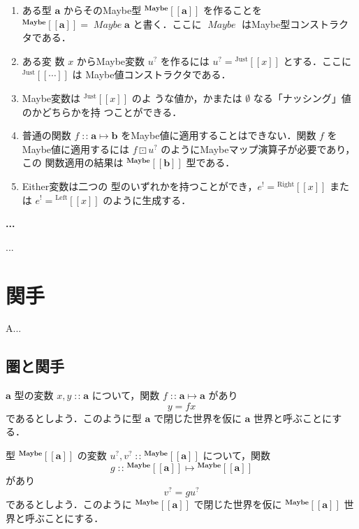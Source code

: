 \documentclass[a5paper,twoside,fleqn,draft]{jsbook}
\def\[{\left[\!\left[}
\def\]{\right]\!\right]}
\newenvironment{leader}{\begingroup\gt}{\endgroup}
\newenvironment{note}[1]{\begin{boxnote}\begin{center}\textbf{#1}\end{center}}{\end{boxnote}}
\newcommand{\mNothing}{\emptyset}
\DeclareMathOperator{\mIn}{{:\!:}}
\DeclareMathOperator{\mMapMaybe}{\boxdot}
\DeclareMathOperator{\mMapsTo}{\mapsto}
\newcommand{\mSpecialSub}[1]{\text{#1}}
\newcommand{\mLeft}{\mSpecialSub{Left}}
\newcommand{\mRight}{\mSpecialSub{Right}}
\newcommand{\mType}[1]{\mathbf{#1}}
\newcommand{\mGenericTypeAssemble}[2]{{}^{\mType{#1}}\[\mType{#2}\]}
\newcommand{\mMaybeType}[1]{\mGenericTypeAssemble{Maybe}{#1}}
\newcommand{\mTypeConstructor}[1]{\textit{#1}}
\DeclareMathOperator{\mMaybeTypeConstructor}{\mTypeConstructor{Maybe}}
\newcommand{\mValueConstructor}[1]{\mathrm{#1}}
\newcommand{\mGenericValueAssemble}[2]{{}^\mValueConstructor{#1}\[#2\]}
\newcommand{\mLeftWith}[1]{\mGenericValueAssemble{\mLeft}{#1}}
\newcommand{\mRightWith}[1]{\mGenericValueAssemble{\mRight}{#1}}
\newcommand{\mJustWith}[1]{\mGenericValueAssemble{Just}{#1}}
\newcommand{\mEither}[1]{{#1}^!}
\newcommand{\mMaybe}[1]{{#1}^?}
\newcommand{\mProj}[2]{#1\mMapsTo#2}
\begin{document}
\begin{enumerate}
\item ある型 $\mType{a}$ からそのMaybe型 $\mMaybeType{a}$ を作ることを
$\mMaybeType{a}=\mMaybeTypeConstructor\mType{a}$ と書く．ここに
$\mMaybeTypeConstructor$ はMaybe型コンストラクタである．\item ある変
数 $x$ からMaybe変数 $\mMaybe{u}$ を作るには
$\mMaybe{u}=\mJustWith{x}$ とする．ここに $\mJustWith{\dotsb}$ は
Maybe値コンストラクタである．\item Maybe変数は $\mJustWith{x}$ のよ
うな値か，かまたは $\mNothing$ なる「ナッシング」値のかどちらかを持
つことができる．\item 普通の関数 $f\mIn\mProj{\mType{a}}{\mType{b}}$
をMaybe値に適用することはできない．関数 $f$ をMaybe値に適用するには
$f\mMapMaybe\mMaybe{u}$ のようにMaybeマップ演算子が必要であり，この
関数適用の結果は $\mMaybeType{b}$ 型である．\item Either変数は二つの
型のいずれかを持つことができ，$\mEither{e}=\mRightWith{x}$ または
$\mEither{e}=\mLeftWith{x}$ のように生成する．
\end{enumerate}

\begin{note}{...}
...
\end{note}


\chapter{関手}
\label{ch:functor}

\begin{leader}
A...
\end{leader}

\section{圏と関手}

$\mType{a}$ 型の変数 $x,y\mIn\mType{a}$ について，関数
$f\mIn\mProj{\mType{a}}{\mType{a}}$ があり
\begin{equation}
y=fx
\end{equation}
であるとしよう．このように型 $\mType{a}$ で閉じた世界を仮に
$\mType{a}$ 世界と呼ぶことにする．

型 $\mMaybeType{a}$ の変数 $\mMaybe{u},\mMaybe{v}\mIn\mMaybeType{a}$
について，関数
\begin{equation}
g\mIn\mProj{\mMaybeType{a}}{\mMaybeType{a}}
\end{equation}
があり
\begin{equation}
\mMaybe{v}=g\mMaybe{u}
\end{equation}
であるとしよう．このように $\mMaybeType{a}$ で閉じた世界を仮に
$\mMaybeType{a}$ 世界と呼ぶことにする．
\end{document}
